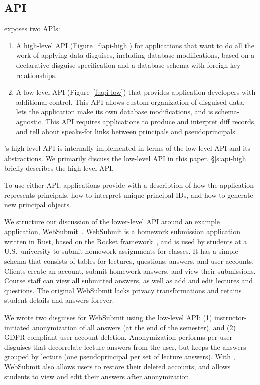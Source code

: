 \subsection{API}
\label{s:api}



\sys exposes two APIs:
\begin{enumerate}[nosep]
 \item A high-level API (Figure~\ref{f:api-high}) for applications that want \sys to do
   all the work of applying data disguises, including database modifications, based on
   a declarative disguise specification and a database schema with foreign key
   relationships.
 \item A low-level API (Figure~\ref{f:api-low}) that provides application developers with
   additional control. This API allows custom organization of disguised data, lets the application
   make its own database modifications, and is schema-agnostic. This API requires applications
   to produce and interpret diff records, and tell \sys about speaks-for links between
   principals and pseudoprincipals.
\end{enumerate}
%
\sys's high-level API is internally implemented in terms of the low-level API and its
abstractions. We primarily discuss the low-level API in this paper.
%
\S\ref{s:api-high} briefly describes the high-level API.
%

%
To use either API, applications provide \sys with a description of how the application represents
principals, how to interpret unique principal IDs, and how to
generate new principal objects.
%

%
We structure our discussion of the lower-level API around an example application, WebSubmit~\cite{websubmit-rs-anon}.
%
WebSubmit is a homework submission application written in Rust, based on the Rocket
framework~\cite{rocket-rs}, and is used by students at a U.S.\ university to submit homework assignments for classes.
%
It has a simple schema that consists of tables for lectures, questions, answers,
and user accounts.
%
Clients create an account, submit homework answers, and view their submissions.
%
Course staff can view all submitted answers, as well as add and edit lectures and
questions.
%
The original WebSubmit lacks privacy transformations and retains student
details and answers forever.
%

%
We wrote two disguises for WebSubmit using the low-level API: (1) instructor-initiated anonymization
of all answers (\eg at the end of the semester), and (2) GDPR-compliant user account deletion.
%
Anonymization performs per-user disguises that decorrelate lecture answers from the user, but keeps
the answers grouped by lecture (\ie one pseudoprincipal per set of lecture answers).
%
With \sys, WebSubmit also allows users to restore their deleted accounts, and allows students to
view and edit their answers after anonymization.

